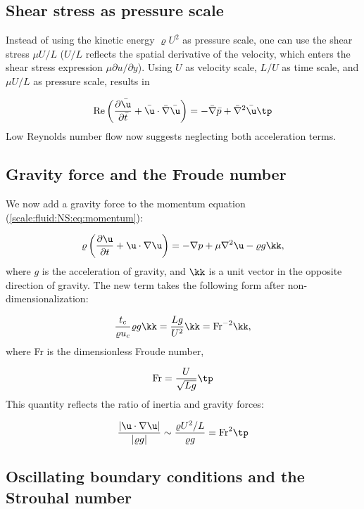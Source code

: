 \documentclass[graybox,envcountchap,sectrefs,final]{svmonodo}
\begin{document}

\subsection{Shear stress as pressure scale}

Instead of using the kinetic energy $\varrho U^2$ as pressure scale,
one can use the shear stress $\mu U/L$ ($U/L$ reflects the spatial
derivative of the velocity, which enters the shear stress expression
$\mu\partial u/\partial y$). Using $U$ as velocity scale, $L/U$ as
time scale, and $\mu U/L$ as pressure scale, results in

\begin{equation}
\hbox{Re}\left(\frac{\partial \bar\u}{\partial \bar t} +
\bar\u\cdot\bar\nabla\bar\u\right)
= -\bar\nabla\bar p + \bar\nabla^2\bar\u\tp
\end{equation}
Low Reynolds number flow now suggests neglecting both acceleration terms.


\subsection{Gravity force and the Froude number}

We now add a gravity force to the momentum equation
(\ref{scale:fluid:NS:eq:momentum}):

\begin{equation}
\varrho\left(\frac{\partial \u}{\partial t} + \u\cdot\nabla\u\right)
= -\nabla p + \mu\nabla^2\u - \varrho g\kk,
\label{scale:fluid:NS:eq:momentum_g}
\end{equation}
where $g$ is the acceleration of gravity, and $\kk$ is a unit
vector in the opposite direction of gravity. The new term
takes the following form after non-dimensionalization:

\[ \frac{t_c}{\varrho  u_c}\varrho g \kk =  \frac{Lg}{U^2}\kk
= \hbox{Fr}^{-2}\kk,\]
where Fr is the dimensionless Froude number,

\[ \hbox{Fr} = \frac{U}{\sqrt{Lg}}\tp\]
This quantity reflects the ratio of inertia and gravity forces:

\[ \frac{|\u\cdot\nabla\u|}{|\varrho g|} \sim \frac{\varrho U^2/L}{\varrho g}
= \hbox{Fr}^2\tp\]


\subsection{Oscillating boundary conditions and the Strouhal number}
\end{document}
